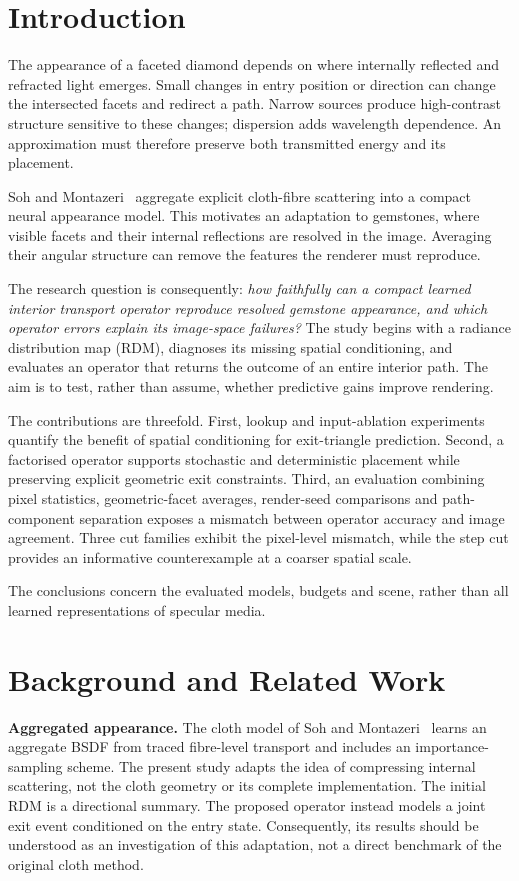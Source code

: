 \documentclass[conference]{IEEEtran}
\begin{document}
\section{Introduction}
The appearance of a faceted diamond depends on where internally reflected and
refracted light emerges. Small changes in entry position or direction can
change the intersected facets and redirect a path. Narrow sources produce
high-contrast structure sensitive to these changes; dispersion adds wavelength
dependence. An approximation must therefore preserve both transmitted energy
and its placement.

Soh and Montazeri~\cite{soh2024} aggregate explicit cloth-fibre scattering into
a compact neural appearance model. This motivates an adaptation to gemstones,
where visible facets and their internal reflections are resolved in the image.
Averaging their angular structure can remove the features the renderer must
reproduce.

The research question is consequently: \emph{how faithfully can a compact
learned interior transport operator reproduce resolved gemstone appearance, and
which operator errors explain its image-space failures?} The study begins with
a radiance distribution map (RDM), diagnoses its missing spatial conditioning,
and evaluates an operator that returns the outcome of an entire interior path.
The aim is to test, rather than assume, whether predictive gains improve rendering.

The contributions are threefold. First, lookup and input-ablation experiments
quantify the benefit of spatial conditioning for exit-triangle prediction.
Second, a factorised operator supports stochastic and deterministic placement
while preserving explicit geometric exit constraints. Third, an evaluation
combining pixel statistics, geometric-facet averages, render-seed comparisons
and path-component separation exposes a mismatch between operator accuracy and
image agreement. Three cut families exhibit the pixel-level mismatch, while
the step cut provides an informative counterexample at a coarser spatial scale.

The conclusions concern the evaluated models, budgets and scene, rather than
all learned representations of specular media.

\section{Background and Related Work}
\textbf{Aggregated appearance.} The cloth model of Soh and
Montazeri~\cite{soh2024} learns an aggregate BSDF from traced fibre-level
transport and includes an importance-sampling scheme. The present study adapts
the idea of compressing internal scattering, not the cloth geometry or its
complete implementation. The initial RDM is a directional summary. The proposed
operator instead models a joint exit event conditioned on the entry state.
Consequently, its results should be understood as an investigation of this
adaptation, not a direct benchmark of the original cloth method.
\end{document}
